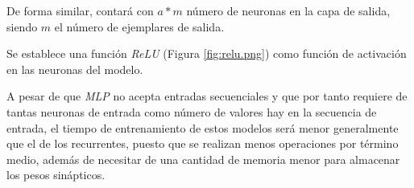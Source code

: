 De forma similar, contará con \(a * m\) número de neuronas en la capa de salida, siendo
\(m\) el número de ejemplares de salida.


Se establece una función \textit{ReLU} (Figura \ref{fig:relu.png}) como función
de activación en las neuronas del modelo.


A pesar de que \textit{MLP} no acepta entradas secuenciales y que por tanto requiere de
tantas neuronas de entrada como número de valores hay en la secuencia de entrada,
el tiempo de entrenamiento de estos modelos será menor generalmente que el de los
recurrentes, puesto que se realizan menos operaciones por término medio,
además de necesitar de una cantidad de memoria menor para almacenar los pesos sinápticos.
